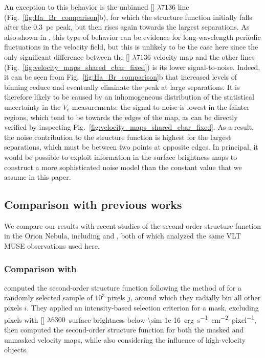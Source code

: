 \documentclass[fleqn,usenatbib, useAMS, a4paper]{mnras}
\newcommand\Wav[1]{\ensuremath{\lambda #1}}
\newcommand\ariii{[\ion{Ar}{III}] \Wav{7136}}
\newcommand\oi{[\ion{O}{I}] \Wav{6300}}
\newcommand\vcentroid{\ensuremath{V_{\text{c}}}}
\begin{document}
An exception to this behavior is the unbinned \ariii{} line (Fig.~\ref{fig:Ha_Br_comparison}b),
for which the structure function initially falls after the \qty{0.3}{pc} peak,
but then rises again towards the largest separations.
As also shown in \citet[][Sec.~3.2.3]{garciav23}, this type of behavior can be evidence for
long-wavelength periodic fluctuations in the velocity field,
but this is unlikely to be the case here since the only significant difference
between the \ariii{} velocity map and the other lines (Fig.~\ref{fig:velocity_maps_shared_cbar_fixed})
is its lower signal-to-noise.
Indeed, it can be seen from Fig.~\ref{fig:Ha_Br_comparison}b that increased levels of binning
reduce and eventually eliminate the peak at large separations.
It is therefore likely to be caused by an inhomogeneous distribution of the
statistical uncertainty in the \(\vcentroid\) measurements:
the signal-to-noise is lowest in the fainter regions,
which tend to be towards the edges of the map,
as can be directly verified by inspecting Fig.~\ref{fig:velocity_maps_shared_cbar_fixed}.
As a result, the noise contribution to the structure function is highest for the largest separations,
which must be between two points at opposite edges.
In principal, it would be possible to exploit information in the surface brightness maps
to construct a more sophisticated noise model than the constant value that we assume in this paper.





\subsection{Comparison with previous works}

We compare our results with recent studies of the second-order structure function in the Orion Nebula, including \citet{2016MNRAS.455.4057M} and \citet{2019MNRAS.483..704A}, both of which analyzed the same VLT MUSE observations used here.

\subsubsection{Comparison with \citet{2016MNRAS.455.4057M}}\label{sec:comp_McLeod}

\citet{2016MNRAS.455.4057M} computed the second-order structure function following the method of \citet{2015MNRAS.447.1341B} for a randomly selected sample of \(10^3\) pixels \(j\), around which they radially bin all other pixels \(i\). 
They applied an intensity-based selection criterion for a mask, excluding pixels with \oi\ surface brightness below \qty{\sim 1e-16}{erg.s^{-1}.cm^{-2}.pixel^{-1}},
then computed the second-order structure function for both the masked and unmasked velocity maps, while also considering the influence of high-velocity objects.
\end{document}

